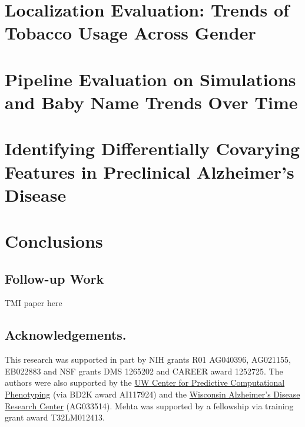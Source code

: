 \section{Localization Evaluation: Trends of Tobacco Usage Across Gender}
\label{sec:loceval}

\section{Pipeline Evaluation on Simulations and Baby Name Trends Over Time}
\label{sec:pipeval}

\section{Identifying Differentially Covarying Features in Preclinical Alzheimer's Disease}
\label{sec:wrap}

\section{Conclusions}

\subsection{Follow-up Work}
TMI paper here

\subsection{Acknowledgements.}
This research was supported in part by NIH grants R01 AG040396, AG021155, EB022883 
and NSF grants DMS 1265202 and CAREER award 1252725. The authors were also supported by 
the \href{http://cpcp.wisc.edu/}{UW Center for Predictive Computational Phenotyping} (via BD2K award AI117924) and the 
\href{http://www.adrc.wisc.edu/}{Wisconsin Alzheimer's Disease Research Center} (AG033514). 
Mehta was supported by a fellowship via training grant award T32LM012413. 
